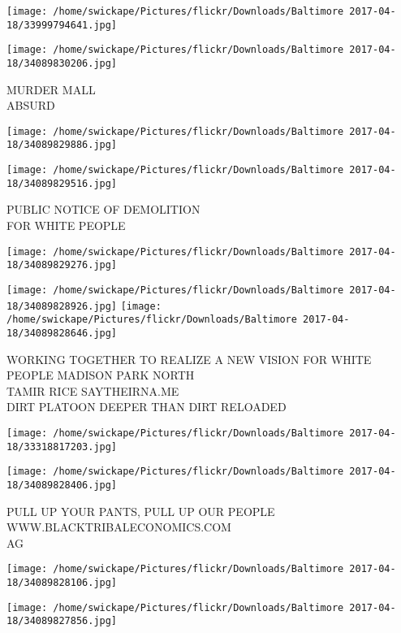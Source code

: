 \documentclass[10pt,letterpaper]{article}
\begin{document}
\texttt{[image: /home/swickape/Pictures/flickr/Downloads/Baltimore 2017-04-18/33999794641.jpg]}

\vspace{0.25in}
\texttt{[image: /home/swickape/Pictures/flickr/Downloads/Baltimore 2017-04-18/34089830206.jpg]}

MURDER MALL\\
ABSURD
\pagebreak

\texttt{[image: /home/swickape/Pictures/flickr/Downloads/Baltimore 2017-04-18/34089829886.jpg]}

\vspace{0.25in}
\texttt{[image: /home/swickape/Pictures/flickr/Downloads/Baltimore 2017-04-18/34089829516.jpg]}

PUBLIC NOTICE OF DEMOLITION\\
FOR WHITE PEOPLE
\pagebreak

\texttt{[image: /home/swickape/Pictures/flickr/Downloads/Baltimore 2017-04-18/34089829276.jpg]}

\vspace{0.25in}
\texttt{[image: /home/swickape/Pictures/flickr/Downloads/Baltimore 2017-04-18/34089828926.jpg]}
\texttt{[image: /home/swickape/Pictures/flickr/Downloads/Baltimore 2017-04-18/34089828646.jpg]}

WORKING TOGETHER TO REALIZE A NEW VISION FOR WHITE PEOPLE MADISON PARK NORTH\\
TAMIR RICE SAYTHEIRNA.ME\\
DIRT PLATOON DEEPER THAN DIRT RELOADED
\pagebreak

\texttt{[image: /home/swickape/Pictures/flickr/Downloads/Baltimore 2017-04-18/33318817203.jpg]}

\vspace{0.25in}
\texttt{[image: /home/swickape/Pictures/flickr/Downloads/Baltimore 2017-04-18/34089828406.jpg]}

PULL UP YOUR PANTS, PULL UP OUR PEOPLE WWW.BLACKTRIBALECONOMICS.COM\\
AG
\pagebreak

\texttt{[image: /home/swickape/Pictures/flickr/Downloads/Baltimore 2017-04-18/34089828106.jpg]}

\vspace{0.25in}
\texttt{[image: /home/swickape/Pictures/flickr/Downloads/Baltimore 2017-04-18/34089827856.jpg]}
\end{document}
